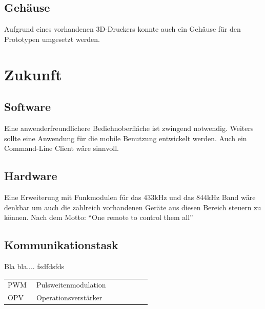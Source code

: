 \documentclass[11pt,a4paper,bibtotoc,oneside]{scrbook}
\begin{document}
\section{Gehäuse}
Aufgrund eines vorhandenen 3D-Druckers konnte auch ein Gehäuse für den Prototypen umgesetzt werden.

\chapter{Zukunft}

\section{Software}
Eine anwenderfreundlichere Bediehnoberfläche ist zwingend notwendig. Weiters sollte eine Anwendung für die
mobile Benutzung entwickelt werden. Auch ein Command-Line Client wäre sinnvoll.

\section{Hardware}
Eine Erweiterung mit Funkmodulen für das 433kHz und das 844kHz Band wäre denkbar um auch die zahlreich vorhandenen
Geräte aus diesen Bereich steuern zu können. Nach dem Motto: ``One remote to control them all''

\section{Kommunikationstask}
Bla bla.... fsdfdsfds




%
%

%

\hspace{-17mm}\begin{tabular}{>{\raggedleft}p{0.2\linewidth} p{0.75\linewidth} p{0.1\linewidth}}
PWM & Pulsweitenmodulation \\
OPV & Operationsverstärker
\end{tabular}
\end{document}
